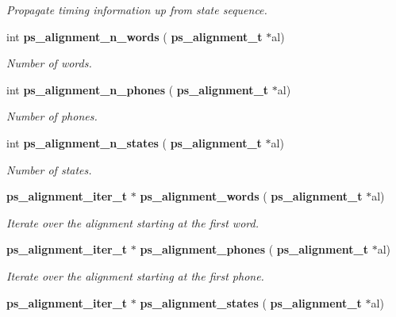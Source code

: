 \begin{DoxyCompactItemize}
\begin{DoxyCompactList}\small\item\em Propagate timing information up from state sequence. \end{DoxyCompactList}\item 
\mbox{\label{ps__alignment_8c_a89fdf321c5a6ee6edeb9c2757d7509cf}} 
int \textbf{ ps\+\_\+alignment\+\_\+n\+\_\+words} (\textbf{ ps\+\_\+alignment\+\_\+t} $\ast$al)
\begin{DoxyCompactList}\small\item\em Number of words. \end{DoxyCompactList}\item 
\mbox{\label{ps__alignment_8c_ab541dcf586611d20e84fd9ec562e7a52}} 
int \textbf{ ps\+\_\+alignment\+\_\+n\+\_\+phones} (\textbf{ ps\+\_\+alignment\+\_\+t} $\ast$al)
\begin{DoxyCompactList}\small\item\em Number of phones. \end{DoxyCompactList}\item 
\mbox{\label{ps__alignment_8c_acfed230b07c1e09fae89eeb74c468460}} 
int \textbf{ ps\+\_\+alignment\+\_\+n\+\_\+states} (\textbf{ ps\+\_\+alignment\+\_\+t} $\ast$al)
\begin{DoxyCompactList}\small\item\em Number of states. \end{DoxyCompactList}\item 
\mbox{\label{ps__alignment_8c_a8d2b39bad3a4f6018155e9101dee63f8}} 
\textbf{ ps\+\_\+alignment\+\_\+iter\+\_\+t} $\ast$ \textbf{ ps\+\_\+alignment\+\_\+words} (\textbf{ ps\+\_\+alignment\+\_\+t} $\ast$al)
\begin{DoxyCompactList}\small\item\em Iterate over the alignment starting at the first word. \end{DoxyCompactList}\item 
\mbox{\label{ps__alignment_8c_a5d4fe03d7eef6a96ca8f1b21b9fd3a33}} 
\textbf{ ps\+\_\+alignment\+\_\+iter\+\_\+t} $\ast$ \textbf{ ps\+\_\+alignment\+\_\+phones} (\textbf{ ps\+\_\+alignment\+\_\+t} $\ast$al)
\begin{DoxyCompactList}\small\item\em Iterate over the alignment starting at the first phone. \end{DoxyCompactList}\item 
\mbox{\label{ps__alignment_8c_a8c6ba334f7dcf512f8485ca7a0b2d2c0}} 
\textbf{ ps\+\_\+alignment\+\_\+iter\+\_\+t} $\ast$ \textbf{ ps\+\_\+alignment\+\_\+states} (\textbf{ ps\+\_\+alignment\+\_\+t} $\ast$al)

\end{DoxyCompactItemize}
